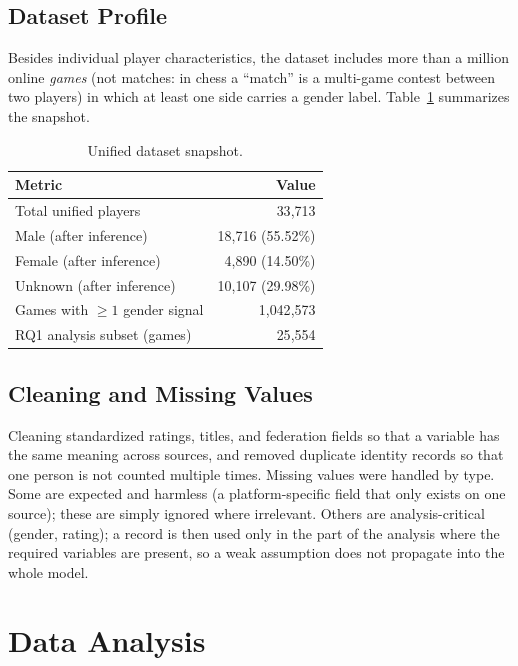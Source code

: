 \documentclass[11pt,a4paper]{article}
\begin{document}
\subsection{Dataset Profile}
Besides individual player characteristics, the dataset includes more than a million online
\emph{games} (not matches: in chess a ``match'' is a multi-game contest between two players)
in which at least one side carries a gender label. Table~\ref{tab:snapshot} summarizes the
snapshot.

\begin{table}[H]
\caption{Unified dataset snapshot.}
\label{tab:snapshot}
\centering
\begin{tabular}{lr}
\toprule
Metric & Value \\
\midrule
Total unified players                 & 33{,}713 \\
\quad Male (after inference)          & 18{,}716 (55.52\%) \\
\quad Female (after inference)        & 4{,}890 (14.50\%) \\
\quad Unknown (after inference)       & 10{,}107 (29.98\%) \\
Games with $\ge 1$ gender signal      & 1{,}042{,}573 \\
RQ1 analysis subset (games)           & 25{,}554 \\
\bottomrule
\end{tabular}
\end{table}

\subsection{Cleaning and Missing Values}
Cleaning standardized ratings, titles, and federation fields so that a variable has the same
meaning across sources, and removed duplicate identity records so that one person is not
counted multiple times. Missing values were handled by type. Some are expected and harmless
(a platform-specific field that only exists on one source); these are simply ignored where
irrelevant. Others are analysis-critical (gender, rating); a record is then used only in the
part of the analysis where the required variables are present, so a weak assumption does not
propagate into the whole model.

\section{Data Analysis}
\end{document}
